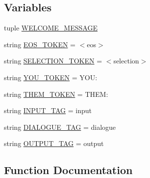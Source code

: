 \subsection*{Variables}
\begin{DoxyCompactItemize}
\item 
tuple \hyperlink{namespaceparlai_1_1tasks_1_1dealnodeal_1_1agents_a1fee23e402c5fa284bb652c46941a65f}{W\+E\+L\+C\+O\+M\+E\+\_\+\+M\+E\+S\+S\+A\+GE}
\item 
string \hyperlink{namespaceparlai_1_1tasks_1_1dealnodeal_1_1agents_a7af5f1e778150283390243efe24f5023}{E\+O\+S\+\_\+\+T\+O\+K\+EN} = \textquotesingle{}$<$eos$>$\textquotesingle{}
\item 
string \hyperlink{namespaceparlai_1_1tasks_1_1dealnodeal_1_1agents_a069d01f3e97896964cdac08f5a058fdd}{S\+E\+L\+E\+C\+T\+I\+O\+N\+\_\+\+T\+O\+K\+EN} = \textquotesingle{}$<$selection$>$\textquotesingle{}
\item 
string \hyperlink{namespaceparlai_1_1tasks_1_1dealnodeal_1_1agents_a3065976d735a2293eed1605b579871ef}{Y\+O\+U\+\_\+\+T\+O\+K\+EN} = \textquotesingle{}Y\+O\+U\+:\textquotesingle{}
\item 
string \hyperlink{namespaceparlai_1_1tasks_1_1dealnodeal_1_1agents_a46076a2892b7821705edb6c536eca182}{T\+H\+E\+M\+\_\+\+T\+O\+K\+EN} = \textquotesingle{}T\+H\+E\+M\+:\textquotesingle{}
\item 
string \hyperlink{namespaceparlai_1_1tasks_1_1dealnodeal_1_1agents_acaaa227420240f06b991aa0ec2aae0bc}{I\+N\+P\+U\+T\+\_\+\+T\+AG} = \textquotesingle{}input\textquotesingle{}
\item 
string \hyperlink{namespaceparlai_1_1tasks_1_1dealnodeal_1_1agents_aec6dc6ffdac8f0d235959647cf3dd95d}{D\+I\+A\+L\+O\+G\+U\+E\+\_\+\+T\+AG} = \textquotesingle{}dialogue\textquotesingle{}
\item 
string \hyperlink{namespaceparlai_1_1tasks_1_1dealnodeal_1_1agents_ad7348f5f2a7d1b0fcc74375816d93cb9}{O\+U\+T\+P\+U\+T\+\_\+\+T\+AG} = \textquotesingle{}output\textquotesingle{}
\end{DoxyCompactItemize}


\subsection{Function Documentation}
\mbox{\label{namespaceparlai_1_1tasks_1_1dealnodeal_1_1agents_a7a1e5d8435af234bbf07491e866bb1fd}} 
